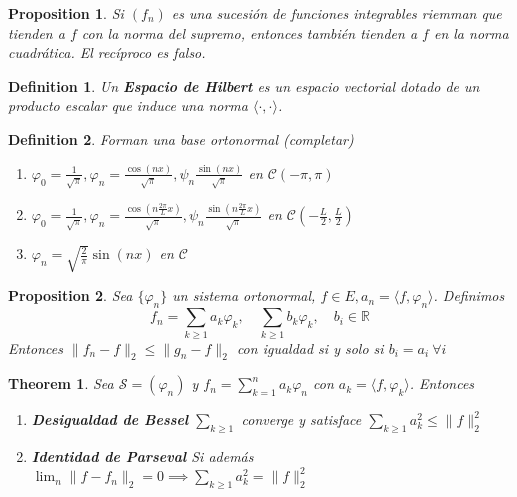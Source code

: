 \documentclass[leqno]{article}
\newtheorem*{definition}{Definition}
\newtheorem*{theorem}{Theorem}
\newtheorem*{proposition}{Proposition}
\begin{document}
\begin{proposition}
Si $(f_n)$ es una sucesión de funciones integrables riemman que tienden a $f$ con la norma del supremo, entonces también tienden a $f$ en la norma cuadrática. El recíproco es falso.
\end{proposition}

\begin{definition}
Un \textbf{Espacio de Hilbert} es un espacio vectorial dotado de un producto escalar que induce una norma $\langle \cdot , \cdot  \rangle $.
\end{definition}

\begin{definition}
Forman una base ortonormal (completar)
\begin{enumerate}[topsep=-6pt, itemsep=0pt]
  \item $\displaystyle\varphi_0 = \frac{1}{\sqrt{\pi} }, \varphi_n = \frac{\cos(nx)}{\sqrt{\pi} }, \psi _n  \frac{\sin(nx)}{\sqrt{\pi} }$ en $\mathcal{C}(-\pi, \pi)$
  \item $\displaystyle\varphi_0 = \frac{1}{\sqrt{\pi} }, \varphi_n = \frac{\cos(n\frac{2\pi}{L}x)}{\sqrt{\pi} }, \psi _n  \frac{\sin(n\frac{2\pi}{L}x)}{\sqrt{\pi} }$ en $\mathcal{C}(-\frac{L}{2}, \frac{L}{2})$
  \item $\displaystyle\varphi _n = \sqrt{\frac{2}{\pi}}\sin(nx) $ en $\mathcal{C}$
\end{enumerate}
\end{definition}

\begin{proposition}
Sea  $\{\varphi _n\}$ un sistema ortonormal, $f \in  E, a_n = \langle f, \varphi _n \rangle $. Definimos 
\[
f_n = \sum_{k\ge 1} a_k\varphi_k, \quad \sum_{k\ge 1} b_k\varphi _k, \quad b_i \in \mathbb{R}
\] 
Entonces $\|f_n-f\|_2\le \|g_n-f\|_2$ con igualdad si y solo si $b_i=a_i \ \forall i$ 
\end{proposition}

\begin{theorem}
Sea $\mathcal{S} = (\varphi_n)$ y $f_n=\sum_{k= 1}^{n} a_k\varphi _n$ con $a_k = \langle f, \varphi_k  \rangle $. Entonces
\begin{enumerate}[topsep=-6pt, itemsep=0pt]
  \item \textbf{Desigualdad de Bessel} $\sum_{k\ge 1} $ converge y satisface $\sum_{k\ge 1} a_k^2\le \|f\|_{2}^2 $
  \item \textbf{Identidad de Parseval} Si además $\lim_{n}\|f-f_n\|_2=0 \implies  \sum_{k\ge 1} a_k^2 = \|f\|_2^2  $
\end{enumerate}
\end{theorem}
\end{document}
